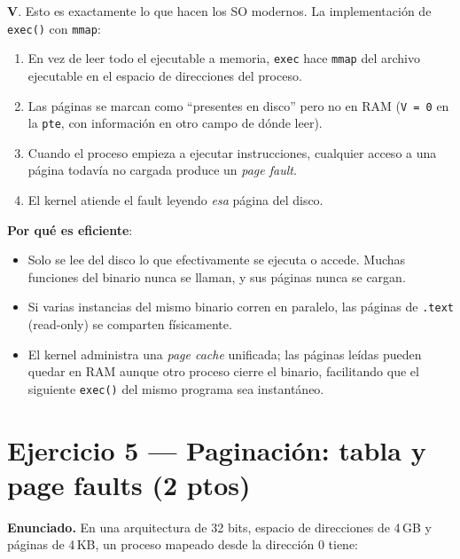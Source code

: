 \documentclass[11pt,a4paper]{article}
\begin{document}
\begin{respuesta}
\textbf{V}. Esto es exactamente lo que hacen los SO modernos. La
implementación de \texttt{exec()} con \texttt{mmap}:

\begin{enumerate}[leftmargin=*,nosep]
    \item En vez de leer todo el ejecutable a memoria, \texttt{exec}
        hace \texttt{mmap} del archivo ejecutable en el espacio de
        direcciones del proceso.
    \item Las páginas se marcan como ``presentes en disco'' pero
        no en RAM (\texttt{V = 0} en la \texttt{pte}, con
        información en otro campo de dónde leer).
    \item Cuando el proceso empieza a ejecutar instrucciones,
        cualquier acceso a una página todavía no cargada produce un
        \emph{page fault}.
    \item El kernel atiende el fault leyendo \emph{esa} página del
        disco.
\end{enumerate}

\textbf{Por qué es eficiente}:

\begin{itemize}[leftmargin=*,nosep]
    \item Solo se lee del disco lo que efectivamente se ejecuta o
        accede. Muchas funciones del binario nunca se llaman, y sus
        páginas nunca se cargan.
    \item Si varias instancias del mismo binario corren en
        paralelo, las páginas de \texttt{.text} (read-only) se
        comparten físicamente.
    \item El kernel administra una \emph{page cache} unificada;
        las páginas leídas pueden quedar en RAM aunque otro proceso
        cierre el binario, facilitando que el siguiente
        \texttt{exec()} del mismo programa sea instantáneo.
\end{itemize}
\end{respuesta}

\section{Ejercicio 5 --- Paginación: tabla y page faults (2 ptos)}

\textbf{Enunciado.} En una arquitectura de 32 bits, espacio de
direcciones de 4\,GB y páginas de 4\,KB, un proceso mapeado desde la
dirección 0 tiene:
\end{document}
